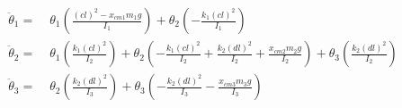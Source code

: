\documentclass[fontsize=11pt,
  paper=a4paper,
  twoside,
  captions=tableheading,
  index=totoc,
  hyperref]{labbook}
\begin{document}
\begin{addmargin}[4cm]{0cm}
\begin{equation}
\begin{aligned}
  \ddot{\theta}_1 =\; & \theta_1 \left( \frac{(cl)^2 - x_{cm1} m_1 g}{I_1} \right) + \theta_2 \left( -\frac{k_1 (cl)^2}{I_1} \right) \\
  \ddot{\theta}_2 =\; & \theta_1 \left( \frac{k_1 (cl)^2}{I_2} \right) + \theta_2 \left( -\frac{k_1 (cl)^2}{I_2} + \frac{k_2 (dl)^2}{I_2} + \frac{x_{cm2} m_2 g}{I_2} \right) + \theta_3 \left( \frac{k_2 (dl)^2}{I_2} \right) \\
  \ddot{\theta}_3 =\; & \theta_2 \left( \frac{k_2 (dl)^2}{I_3} \right) + \theta_3 \left( -\frac{k_2 (dl)^2}{I_3} - \frac{x_{cm3} m_3 g}{I_3} \right)
  \end{aligned}
\end{equation}




\end{addmargin}


\end{document}
